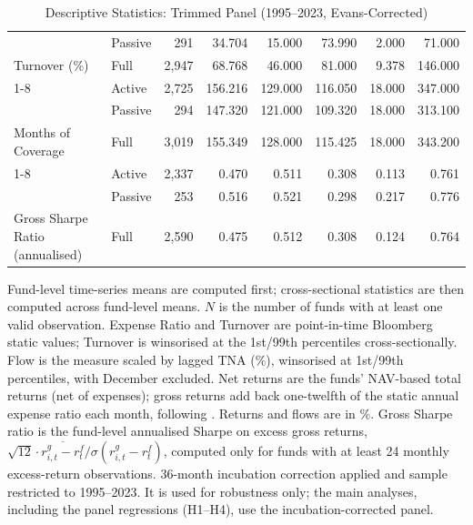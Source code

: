 \begin{table}[H]
{\begin{tabular}[t]{llrrrrrr}
 & Passive & 291 & 34.704 & 15.000 & 73.990 & 2.000 & 71.000\\

\multirow{-3}{*}{\raggedright\arraybackslash Turnover (\%)} & Full & 2,947 & 68.768 & 46.000 & 81.000 & 9.378 & 146.000\\
\cmidrule{1-8}
 & Active & 2,725 & 156.216 & 129.000 & 116.050 & 18.000 & 347.000\\

 & Passive & 294 & 147.320 & 121.000 & 109.320 & 18.000 & 313.100\\

\multirow{-3}{*}{\raggedright\arraybackslash Months of Coverage} & Full & 3,019 & 155.349 & 128.000 & 115.425 & 18.000 & 343.200\\
\cmidrule{1-8}
 & Active & 2,337 & 0.470 & 0.511 & 0.308 & 0.113 & 0.761\\

 & Passive & 253 & 0.516 & 0.521 & 0.298 & 0.217 & 0.776\\

\multirow{-3}{*}{\raggedright\arraybackslash Gross Sharpe Ratio (annualised)} & Full & 2,590 & 0.475 & 0.512 & 0.308 & 0.124 & 0.764\\
\bottomrule
\end{tabular}%
}
\setlength{\tabletempwidth}{\wd\tabletempbox}
\ifdim\tabletempwidth>\linewidth\setlength{\tabletempwidth}{\linewidth}\fi
\begin{minipage}{\tabletempwidth}
\captionsetup{width=\linewidth}
\caption{\label{tab:desc_stats_trimmed}Descriptive Statistics: Trimmed Panel (1995--2023, Evans-Corrected)}
\ifdim\wd\tabletempbox>\linewidth
  \resizebox{\linewidth}{!}{\usebox{\tabletempbox}}
\else
  \usebox{\tabletempbox}
\fi
\par\medskip
\begin{singlespace}\footnotesize\noindent
Fund-level time-series means are computed first; cross-sectional statistics are then computed across fund-level means. $N$ is the number of funds with at least one valid observation. Expense Ratio and Turnover are point-in-time Bloomberg static values; Turnover is winsorised at the 1st/99th percentiles cross-sectionally. Flow is the \textcite{SirriTufano1998} measure scaled by lagged TNA (\%), winsorised at 1st/99th percentiles, with December excluded. Net returns are the funds' NAV-based total returns (net of expenses); gross returns add back one-twelfth of the static annual expense ratio each month, following \textcite{FamaFrench2010}. Returns and flows are in \%. Gross Sharpe ratio is the fund-level annualised Sharpe on excess gross returns, $\sqrt{12}\cdot\overline{r^{g}_{i,t}-r^{f}_{t}}/\sigma(r^{g}_{i,t}-r^{f}_{t})$, computed only for funds with at least 24 monthly excess-return observations. \textcite{Evans2010} 36-month incubation correction applied and sample restricted to 1995--2023. It is used for robustness only; the main analyses, including the panel regressions (H1--H4), use the incubation-corrected panel.
\end{singlespace}
\end{minipage}
\end{table}

